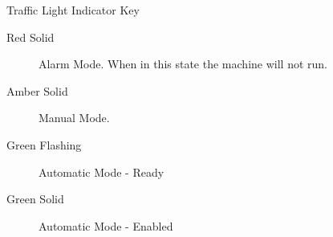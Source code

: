 Traffic Light Indicator Key      
    \begin{description}
        \item[Red Solid] Alarm Mode. When in this state the machine will not run. 
        \item[Amber Solid] Manual Mode.
        \item[Green Flashing]  Automatic Mode - Ready
        \item[Green Solid]  Automatic Mode - Enabled
    \end{description}